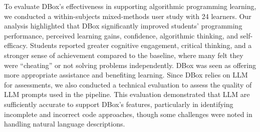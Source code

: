 



To evaluate DBox's effectiveness in supporting algorithmic programming learning, we conducted a within-subjects mixed-methods user study with 24 learners.
Our analysis highlighted that DBox significantly improved students' programming performance, perceived learning gains, confidence, algorithmic thinking, and self-efficacy. 
Students reported greater cognitive engagement, critical thinking, and a stronger sense of achievement compared to the baseline, where many felt they were ``cheating'' or not solving problems independently. 
DBox was seen as offering more appropriate assistance and benefiting learning. 
Since DBox relies on LLM for assessments, we also conducted a technical evaluation to assess the quality of LLM prompts used in the pipeline. 
This evaluation demonstrated that LLM are sufficiently accurate to support DBox's features, particularly in identifying incomplete and incorrect code approaches, though some challenges were noted in handling natural language descriptions.

